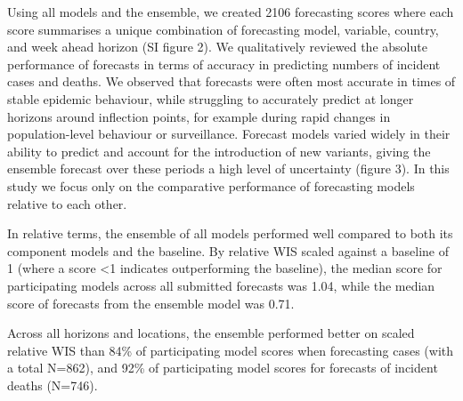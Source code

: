 \documentclass[
]{article}
\begin{document}
Using all models and the ensemble, we created 2106 forecasting scores
where each score summarises a unique combination of forecasting model,
variable, country, and week ahead horizon (SI figure 2). We
qualitatively reviewed the absolute performance of forecasts in terms of
accuracy in predicting numbers of incident cases and deaths. We observed
that forecasts were often most accurate in times of stable epidemic
behaviour, while struggling to accurately predict at longer horizons
around inflection points, for example during rapid changes in
population-level behaviour or surveillance. Forecast models varied
widely in their ability to predict and account for the introduction of
new variants, giving the ensemble forecast over these periods a high
level of uncertainty (figure 3). In this study we focus only on the
comparative performance of forecasting models relative to each other.

In relative terms, the ensemble of all models performed well compared to
both its component models and the baseline. By relative WIS scaled
against a baseline of 1 (where a score \textless1 indicates
outperforming the baseline), the median score for participating models
across all submitted forecasts was 1.04, while the median score of
forecasts from the ensemble model was 0.71.

Across all horizons and locations, the ensemble performed better on
scaled relative WIS than 84\% of participating model scores when
forecasting cases (with a total N=862), and 92\% of participating model
scores for forecasts of incident deaths (N=746).
\end{document}

